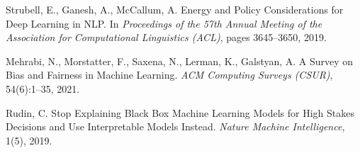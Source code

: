 \documentclass[conference]{IEEEtran}
\begin{document}
\begin{thebibliography}{999}
Strubell, E., Ganesh, A., McCallum, A.
\newblock Energy and Policy Considerations for Deep Learning in NLP.
\newblock In \emph{Proceedings of the 57th Annual Meeting of the Association for Computational Linguistics (ACL)}, pages 3645–3650, 2019.

Mehrabi, N., Morstatter, F., Saxena, N., Lerman, K., Galstyan, A.
\newblock A Survey on Bias and Fairness in Machine Learning.
\newblock \emph{ACM Computing Surveys (CSUR)}, 54(6):1–35, 2021.

Rudin, C.
\newblock Stop Explaining Black Box Machine Learning Models for High Stakes Decisions and Use Interpretable Models Instead.
\newblock \emph{Nature Machine Intelligence}, 1(5), 2019.

\end{thebibliography}
\end{document}
